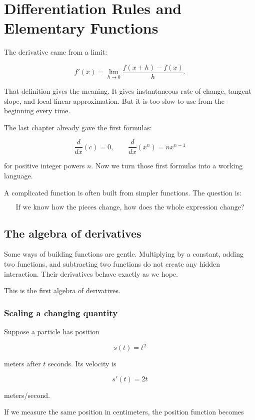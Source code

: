 \chapter{Differentiation Rules and Elementary Functions}
\label{chap:differentiation-rules-elementary-functions}

The derivative came from a limit:

\[
f'(x)=\lim_{h\to0}\frac{f(x+h)-f(x)}{h}.
\]

That definition gives the meaning.  It gives instantaneous rate of change, tangent slope, and local linear approximation.  But it is too slow to use from the beginning every time.

The last chapter already gave the first formulas:

\[
\frac{d}{dx}(c)=0,
\qquad
\frac{d}{dx}(x^n)=nx^{n-1}
\]

for positive integer powers \(n\).  Now we turn those first formulas into a working language.

A complicated function is often built from simpler functions.  The question is:

\[
\text{If we know how the pieces change, how does the whole expression change?}
\]

\section{The algebra of derivatives}
\label{sec:algebra-of-derivatives}

Some ways of building functions are gentle.  Multiplying by a constant, adding two functions, and subtracting two functions do not create any hidden interaction.  Their derivatives behave exactly as we hope.

This is the first algebra of derivatives.

\subsection{Scaling a changing quantity}
\label{subsec:constant-multiple-rule-ch5}

Suppose a particle has position

\[
s(t)=t^2
\]

meters after \(t\) seconds.  Its velocity is

\[
s'(t)=2t
\]

meters/second.

If we measure the same position in centimeters, the position function becomes

